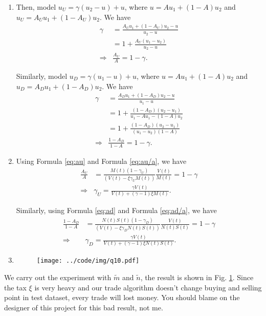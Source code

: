 \documentclass[runningheads]{llncs}
\begin{document}
\begin{enumerate}
\item Then, model $u_U=\gamma(u_2-u)+u$, where $u = Au_1 + (1-A)u_2$ and $u_U = A_U u_1 + (1-A_U)u_2$. We have
\begin{align}
    \gamma&=\frac{A_U u_1+(1-A_U)u_2-u}{u_2-u}\\
    &=1+\frac{A_U(u_1-u_2)}{u_2-u}\\
    \Rightarrow& \frac{A_U}{A}=1-\gamma.\label{eq:au/a}
\end{align}

Similarly, model $u_D=\gamma(u_1-u)+u$, where $u = Au_1 + (1-A)u_2$ and $u_D = A_D u_1 + (1-A_D)u_2$. We have
\begin{align}
    \gamma&=\frac{A_D u_1+(1-A_D)u_2-u}{u_1-u}\\
    &=1+\frac{(1-A_D)(u_2-u_1)}{u_1-Au_1 - (1-A)u_2}\\
    &=1+\frac{(1-A_D)(u_2-u_1)}{(u_1-u_2)(1-A)}\\
    \Rightarrow& \frac{1-A_D}{1-A}=1-\gamma.\label{eq:ad/a}
\end{align}

\item Using Formula \ref{eq:au} and Formula \ref{eq:au/a}, we have
\begin{align}
    \frac{A_U}{A}&=\frac{M(t)(1-\gamma_U)}{\left( V(t)-\xi\gamma_U M(t) \right)} \frac{V(t)}{M(t)}=1-\gamma\\
    \Rightarrow & \gamma_U=\frac{\gamma V(t)}{V(t)+(\gamma-1)\xi M(t)}.
\end{align}

Similarly, using Formula \ref{eq:ad} and Formula \ref{eq:ad/a}, we have
\begin{align}
    \frac{1-A_D}{1-A}&=\frac{N(t)S(t)(1-\gamma_D)}{\left( V(t)-\xi\gamma_D N(t)S(t) \right)} \frac{V(t)}{N(t)S(t)}=1-\gamma\\
    \Rightarrow & \gamma_D=\frac{\gamma V(t)}{V(t)+(\gamma-1)\xi N(t)S(t)}.
\end{align}

\item 
\begin{figure}[!htbp]
    \begin{center}
        \texttt{[image: ../code/img/q10.pdf]}
    \end{center}
    \caption{}
    \label{fig:q10}
\end{figure}
\end{enumerate}

We carry out the experiment with $\tilde{m}$ and $\tilde{n}$, the result is shown in Fig. \ref{fig:q10}.
Since the tax $\xi$ is very heavy and our trade algorithm doesn't change buying and selling point in test dataset, every trade will lost money.
You should blame on the designer of this project for this bad result, not me.
\end{document}
